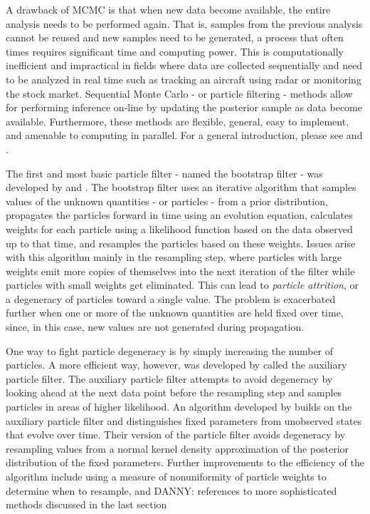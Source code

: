 \documentclass{elsarticle}
\newcommand{\danny}[1]{{\color{blue}DANNY: #1}}
\begin{document}
A drawback of MCMC is that when new data become available, the entire analysis needs to be performed again.  That is, samples from the previous analysis cannot be reused and new samples need to be generated, a process that often times requires significant time and computing power.  This is computationally inefficient and impractical in fields where data are collected sequentially and need to be analyzed in real time such as tracking an aircraft using radar or monitoring the stock market.  Sequential Monte Carlo - or particle filtering - methods allow for performing inference on-line by updating the posterior sample as data become available.  Furthermore, these methods are flexible, general, easy to implement, and amenable to computing in parallel. For a general introduction, please see \cite{Douc:deFr:Gord:sequ:2001} and \cite{cappe2007overview}. 

The first and most basic particle filter - named the bootstrap filter - was developed by \citet{Gord:Salm:Smit:nove:1993} and \cite{Kita:mont:1996} .  The bootstrap filter uses an iterative algorithm that samples values of the unknown quantities - or particles - from a prior distribution, propagates the particles forward in time using an evolution equation, calculates weights for each particle using a likelihood function based on the data observed up to that time, and resamples the particles based on these weights.  Issues arise with this algorithm mainly in the resampling step, where particles with large weights emit more copies of themselves into the next iteration of the filter while particles with small weights get eliminated.  This can lead to \emph{particle attrition}, or a degeneracy of particles toward a single value.  The problem is exacerbated further when one or more of the unknown quantities are held fixed over time, since, in this case, new values are not generated during propagation.

One way to fight particle degeneracy is by simply increasing the number of particles.  A more efficient way, however, was developed by \citet{Pitt:Shep:filt:1999} called the auxiliary particle filter.  The auxiliary particle filter attempts to avoid degeneracy by looking ahead at the next data point before the resampling step and samples particles in areas of higher likelihood.  An algorithm developed by \citet{Liu:West:comb:2001} builds on the auxiliary particle filter and distinguishes fixed parameters from unobserved states that evolve over time.  Their version of the particle filter avoids degeneracy by resampling values from a normal kernel density approximation of the posterior distribution of the fixed parameters.  Further improvements to the efficiency of the algorithm include using a measure of nonuniformity of particle weights to determine when to resample, and \danny{references to more sophisticated methods discussed in the last section}
\end{document}
